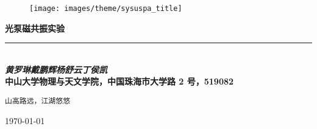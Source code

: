 
\begin{titlepage}
	\parindent=0pt
	
	\hspace*{\fill} %
	
	\vspace{2em} %
	
	\begin{figure}[h!]
		\centering
		\texttt{[image: images/theme/sysuspa\_title]}
	\end{figure}
	
	
	\vspace{5em} %
	
	\begin{flushright}
		{ \Huge \bfseries 光泵磁共振实验} \hspace*{6em} \\[0.3cm]
		
		\rule{0.618\textwidth}{6pt} \hspace*{6em} \\[0.4cm]
		
		\LARGE\emph{\textbf{黄罗琳\quad 戴鹏辉\quad 杨舒云\quad 丁侯凯}} \hspace*{4.1em}	\\[0.7cm]
		
		\large\textbf{中山大学物理与天文学院，中国珠海市大学路 2 号，519082} \hspace*{5em}
		
	\end{flushright}
	
	\begin{center}
		\vfill
		
		\Large\texttt{\textcolor{fgrayblue}{\kaishu 山高路远，江湖悠悠}} %
		
		\hspace*{\fill}
		
		{\LARGE \today}
		
		\hspace*{\fill}
	\end{center}
	
\end{titlepage}